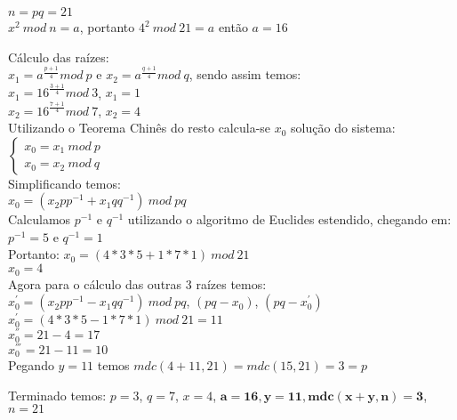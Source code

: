 \documentclass[12pt]{article}
\begin{document}
\begin{itemize}
				$n = pq = 21$\\
				$x^2 \ mod \ n = a$, portanto $4^2 \ mod \ 21  = a$ então $a =  16$
				\newline
				\begin{center}
					Cálculo das raízes:\\
					$x_1 = a^{\frac{p+1}{4}} mod \ p$	e 
					$x_2 = a^{\frac{q+1}{4}} mod \ q$,
					sendo assim temos:\\
					$x_1 = 16^{\frac{3+1}{4}} mod \ 3$, $x_1 = 1$\\
					$x_2 = 16^{\frac{7+1}{4}} mod \ 7$, $x_2 = 4$\\
					Utilizando o Teorema Chinês do resto calcula-se $x_0$
					solução do sistema:
					$ \begin{cases} 
							x_0 = x_1 \ mod \ p \\
							x_0 = x_2 \ mod \ q 
						\end{cases}
					$\\
					Simplificando temos:\\
					$x_0 = (x_2pp^{-1} + x_1qq^{-1}) \ mod \ pq$\\
					Calculamos $p^{-1}$ e $q^{-1}$ utilizando o algoritmo
					de Euclides estendido, chegando em:\\
					$p^{-1} = 5 $ e $q^{-1} = 1 $\\
					Portanto: $x_0 = (4*3*5 + 1*7*1) \ mod \ 21$\\
					$x_0 = 4$\\
					Agora para o cálculo das outras 3 raízes temos:\\
					$x_0^{'} = (x_2pp^{-1} - x_1qq^{-1}) \ mod \ pq$, $(pq - x_0)$,
					$(pq - x_0^{'})$\\
					$x_0^{'} = (4*3*5 - 1*7*1) \ mod \ 21 = 11$\\
					$x_0^{''} = 21 - 4 = 17$\\
					$x_0^{'''} = 21 - 11 = 10$\\
					Pegando $y = 11$ temos $mdc(4+11, 21) = mdc(15, 21) = 3 = p$				
				\end{center} 	
				Terminado temos: 
				$p = 3$, $q = 7$, $x = 4$, $\mathbf{a = 16, y = 11, mdc(x + y, n) = 3}$,
				$n = 21$
		\end{itemize}
\end{document}
